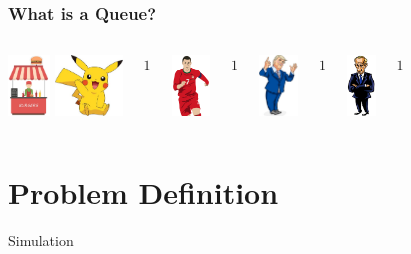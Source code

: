 \documentclass{beamer}
\begin{document}
\begin{frame}
\frametitle{What is a  Queue?}

\begin{columns}

    \includegraphics[height=1.6cm]{Image/Burger_Stall.jpg} \pause
      \includegraphics[height=1.6cm]{Image/pikachu.jpg}
  \begin{center}
    $1$ \pause
  \end{center}

    \includegraphics[height=1.6cm]{Image/ronaldo.png}
    \begin{center}
      $1$ \pause
    \end{center}
    \includegraphics[height=1.6cm]{Image/trump.jpg}
    \begin{center}
      $1$ \pause
    \end{center}

    \includegraphics[height=1.6cm]{Image/putin.jpg}
    \begin{center}
      $1$ \pause
    \end{center}

  \end{columns}

\end{frame}


\section{Problem Definition}
\begin{frame}{Simulation}

\end{frame}
\end{document}
